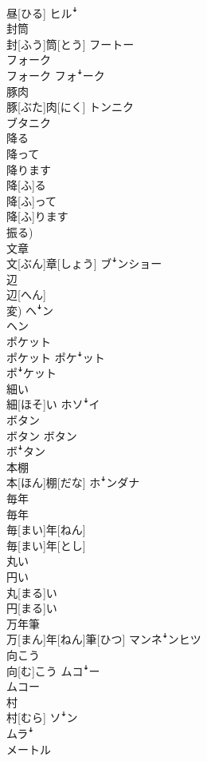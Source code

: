\documentclass[8pt]{extreport}
\begin{document}
\begin{CJK}{UTF8}{min}
\\	昼[ひる]	ヒルꜜ
\\	封筒	
\\	封[ふう]筒[とう]	フートー
\\	フォーク	
\\	フォーク	フォꜜーク
\\	豚肉	
\\	豚[ぶた]肉[にく]	トンニク 
\\	ブタニク
\\	降る 
\\	降って 
\\	降ります	
\\	降[ふ]る 
\\	降[ふ]って 
\\	降[ふ]ります 
\\	振る)	
\\	文章	
\\	文[ぶん]章[しょう]	ブꜜンショー
\\	辺	
\\	辺[へん] 
\\	変)	ヘꜜン 
\\	ヘン
\\	ポケット	
\\	ポケット	ポケꜜット 
\\	ポꜜケット
\\	細い	
\\	細[ほそ]い	ホソꜜイ
\\	ボタン	
\\	ボタン	ボタン 
\\	ボꜜタン
\\	本棚	
\\	本[ほん]棚[だな]	ホꜜンダナ
\\	毎年 
\\	毎年	
\\	毎[まい]年[ねん] 
\\	毎[まい]年[とし]	
\\	丸い 
\\	円い	
\\	丸[まる]い 
\\	円[まる]い	
\\	万年筆	
\\	万[まん]年[ねん]筆[ひつ]	マンネꜜンヒツ
\\	向こう	
\\	向[む]こう	ムコꜜー 
\\	ムコー
\\	村	
\\	村[むら]	ソꜜン 
\\	ムラꜜ
\\	メートル	

\end{CJK}
\end{document}
